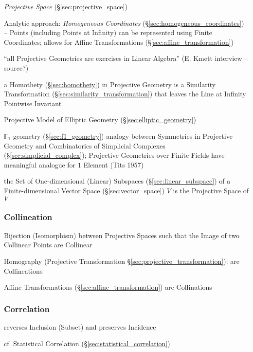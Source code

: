 \emph{Projective Space} (\S\ref{sec:projective_space})

Analytic approach: \emph{Homogeneous Coordinates}
(\S\ref{sec:homogeneous_coordinates}) -- Points (including Points at Infinity)
can be represented using Finite Coordinates; allows for Affine Transformations
(\S\ref{sec:affine_transformation}) %

``all Projective Geometries are exercises in Linear Algebra'' (E.
Kmett interview -- source?) %

a Homothety (\S\ref{sec:homothety}) in Projective Geometry is a Similarity
Transformation (\S\ref{sec:similarity_transformation}) that leaves the Line at
Infinity Pointwise Invariant

Projective Model of Elliptic Geometry (\S\ref{sec:elliptic_geometry})

\fist $\mathbb{F}_1$-geometry (\S\ref{sec:f1_geometry}) analogy between
Symmetries in Projective Geometry and Combinatorics of Simplicial Complexes
(\S\ref{sec:simplicial_complex}); Projective Geometries over Finite Fields have
meaningful analogue for $1$ Element (Tits 1957)

\fist the Set of One-dimensional (Linear) Subspaces
(\S\ref{sec:linear_subspace}) of a Finite-dimensional Vector Space
(\S\ref{sec:vector_space}) $V$ is the Projective Space of $V$



\subsubsection{Collineation}\label{sec:collineation}

Bijection (Isomorphism) between Projective Spaces such that the Image of two
Collinear Points are Collinear

\fist Homography (Projective Transformation
\S\ref{sec:projective_transformation}): are Collineations %

\fist Affine Transformations (\S\ref{sec:affine_transformation}) are
Collinations



\subsubsection{Correlation}\label{sec:correlation}

reverses Inclusion (Subset) and preserves Incidence

\fist cf. Statistical Correlation (\S\ref{sec:statistical_correlation})



